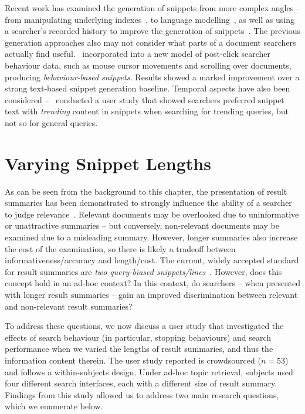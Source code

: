 Recent work has examined the generation of snippets from more complex angles -- from manipulating underlying indexes~\citep{turpin2007fast_snippets, bast2014snippet_generation}, to language modelling~\citep{li2010snippet_extraction, he2012bridging}, as well as using a searcher's recorded history to improve the generation of snippets~\citep{ageev2013summaries, savenkov2011search}. The previous generation approaches also may not consider what parts of a document searchers actually find useful.~\cite{ageev2013summaries} incorporated into a new model of post-click searcher behaviour data, such as mouse cursor movements and scrolling over documents, producing \emph{behaviour-based snippets.} Results showed a marked improvement over a strong text-based snippet generation baseline. Temporal aspects have also been considered --~\cite{svore2012temporal_snippets} conducted a user study that showed searchers preferred snippet text with \emph{trending} content in snippets when searching for trending queries, but not so for general queries.


\section{Varying Snippet Lengths}\label{chap:snippets:user}
As can be seen from the background to this chapter, the presentation of result summaries has been demonstrated to strongly influence the ability of a searcher to judge relevance~\citep{he2012bridging}. Relevant documents may be overlooked due to uninformative or unattractive summaries -- but conversely, non-relevant documents may be examined due to a misleading summary. However, longer summaries also increase the cost of the examination, so there is likely a tradeoff between informativeness/accuracy and length/cost. The current, widely accepted standard for result summaries are \emph{two query-biased snippets/lines}~\citep{hearst2009_search}. However, does this concept hold in an ad-hoc context? In this context, do searchers -- when presented with longer result summaries -- gain an improved discrimination between relevant and non-relevant result summaries?

To address these questions, we now discuss a user study that investigated the effects of search behaviour (in particular, stopping behaviours) and search performance when we varied the lengths of result summaries, and thus the information content therein. The user study reported is crowdsourced ($n=53$) and follows a within-subjects design. Under ad-hoc topic retrieval, subjects used four different search interfaces, each with a different size of result summary. Findings from this study allowed us to address two main research questions, which we enumerate below.


